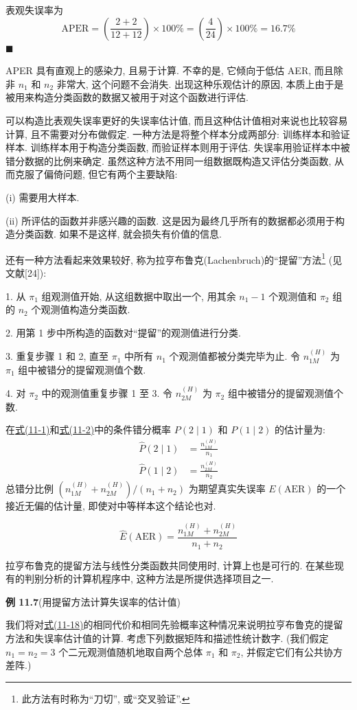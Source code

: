 
表观失误率为
\[
\mathrm{APER}=\left(\frac{2+2}{12+12}\right)\times100\%=\left(\frac{4}{24}\right)\times100\%=16.7\%
\]
\hfill$\blacksquare$

APER 具有直观上的感染力, 且易于计算. 不幸的是, 它倾向于低估 AER, 而且除非 $n_1$ 和 $n_2$ 非常大, 这个问题不会消失. 出现这种乐观估计的原因, 本质上由于是被用来构造分类函数的数据又被用于对这个函数进行评估.

可以构造比表观失误率更好的失误率估计值, 而且这种估计值相对来说也比较容易计算, 且不需要对分布做假定. 一种方法是将整个样本分成两部分: 训练样本和验证样本. 训练样本用于构造分类函数, 而验证样本则用于评估. 失误率用验证样本中被错分数据的比例来确定. 虽然这种方法不用同一组数据既构造又评估分类函数, 从而克服了偏倚问题, 但它有两个主要缺陷:

(i) 需要用大样本.

(ii) 所评估的函数并非感兴趣的函数. 这是因为最终几乎所有的数据都必须用于构造分类函数. 如果不是这样, 就会损失有价值的信息.

还有一种方法看起来效果较好, 称为拉亨布鲁克(Lachenbruch)的“提留”方法\footnote{此方法有时称为“刀切”, 或“交叉验证”.} (见文献[24]):

1. 从 $\pi_1$ 组观测值开始, 从这组数据中取出一个, 用其余 $n_1-1$ 个观测值和 $\pi_2$ 组的 $n_2$ 个观测值构造分类函数.

2. 用第 1 步中所构造的函数对“提留”的观测值进行分类.

3. 重复步骤 1 和 2, 直至 $\pi_1$ 中所有 $n_1$ 个观测值都被分类完毕为止. 令 $n_{1M}^{(H)}$ 为 $\pi_1$ 组中被错分的提留观测值个数.

4. 对 $\pi_2$ 中的观测值重复步骤 1 至 3. 令 $n_{2M}^{(H)}$ 为 $\pi_2$ 组中被错分的提留观测值个数.

在\hyperref[eq:11-1]{式(11-1)}和\hyperref[eq:11-2]{式(11-2)}中的条件错分概率 $P(2\mid1)$ 和 $P(1\mid2)$ 的估计量为:
\label{eq:11-35}
\begin{equation}
\begin{aligned}
\hat{P}(2\mid1)&=\frac{n_{1M}^{(H)}}{n_1}\\
\hat{P}(1\mid2)&=\frac{n_{2M}^{(H)}}{n_2}
\end{aligned}
\tag{11-35}
\end{equation}
总错分比例 $(n_{1M}^{(H)}+n_{2M}^{(H)})/(n_1+n_2)$ 为期望真实失误率 $E(\mathrm{AER})$ 的一个接近无偏的估计量, 即使对中等样本这个结论也对.

\begin{mvbox}
\label{eq:11-36}
\begin{equation}
\hat{E}(\mathrm{AER})=\frac{n_{1M}^{(H)}+n_{2M}^{(H)}}{n_1+n_2}
\tag{11-36}
\end{equation}
\end{mvbox}

拉亨布鲁克的提留方法与线性分类函数共同使用时, 计算上也是可行的. 在某些现有的判别分析的计算机程序中, 这种方法是所提供选择项目之一.

\noindent\textbf{例 11.7}\quad (用提留方法计算失误率的估计值)

我们将对\hyperref[eq:11-18]{式(11-18)}的相同代价和相同先验概率这种情况来说明拉亨布鲁克的提留方法和失误率估计值的计算. 考虑下列数据矩阵和描述性统计数字. (我们假定 $n_1=n_2=3$ 个二元观测值随机地取自两个总体 $\pi_1$ 和 $\pi_2$, 并假定它们有公共协方差阵.)
